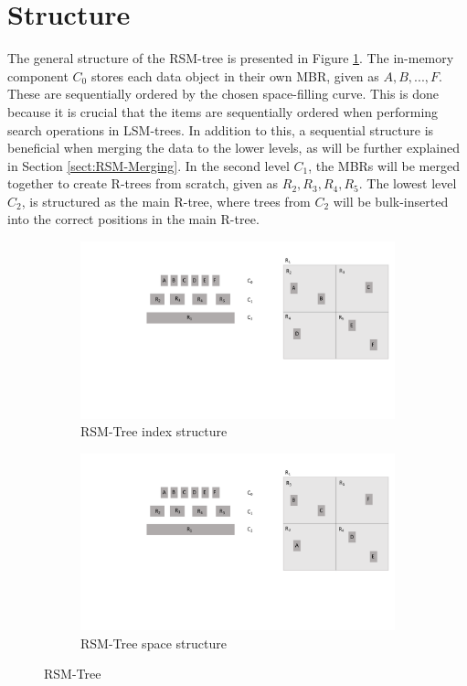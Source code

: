 \section{Structure}
The general structure of the RSM-tree is presented in Figure \ref{fig:RSMTree}. The in-memory component $C_0$ stores each data object in their own MBR, given as $A, B, ..., F$. These are sequentially ordered by the chosen space-filling curve. This is done because it is crucial that the items are sequentially ordered when performing search operations in LSM-trees. In addition to this, a sequential structure is beneficial when merging the data to the lower levels, as will be further explained in Section \ref{sect:RSM-Merging}. In the second level $C_1$, the MBRs will be merged together to create R-trees from scratch, given as $R_2, R_3, R_4, R_5$. The lowest level $C_2$, is structured as the main R-tree, where trees from $C_2$ will be bulk-inserted into the correct positions in the main R-tree.  
\begin{figure}[ht]
     \centering
     \begin{subfigure}{0.45\textwidth}
         \centering
         \includegraphics[width=\textwidth]{figures/RSMTree.pdf}
         \caption{RSM-Tree index structure}
     \end{subfigure}
     \hfill
     \begin{subfigure}{0.45\textwidth}
         \centering
         \includegraphics[width=\textwidth]{figures/RSMTree_space.pdf}
         \caption{RSM-Tree space structure}
     \end{subfigure}
        \caption{RSM-Tree}
        \label{fig:RSMTree}
\end{figure}

